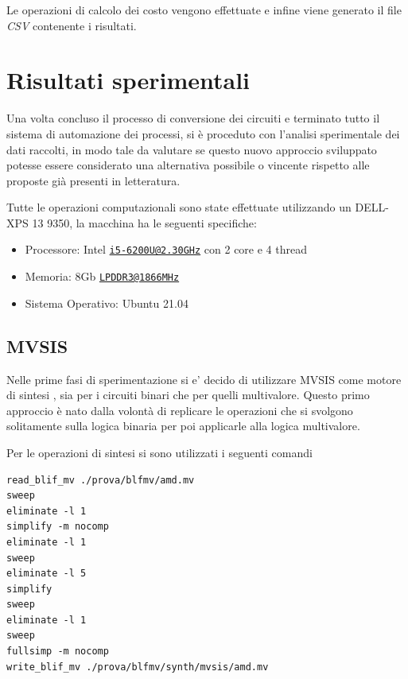 \documentclass[
  italian,
]{book}
\providecommand{\tightlist}{%
  \setlength{\itemsep}{0pt}\setlength{\parskip}{0pt}}
\begin{document}
Le operazioni di calcolo dei costo vengono effettuate e infine viene generato il file \emph{CSV} contenente i risultati.

\hypertarget{risultati-sperimentali}{%
\chapter{Risultati sperimentali}\label{risultati-sperimentali}}

Una volta concluso il processo di conversione dei circuiti e terminato tutto il sistema di automazione dei processi, si è proceduto con l'analisi sperimentale dei dati raccolti, in modo tale da valutare se questo nuovo approccio sviluppato potesse essere considerato una alternativa possibile o vincente rispetto alle proposte già presenti in letteratura.

Tutte le operazioni computazionali sono state effettuate utilizzando un DELL-XPS 13 9350, la macchina ha le seguenti specifiche:

\begin{itemize}
\tightlist
\item
  Processore: Intel \href{mailto:i5-6200U@2.30GHz}{\nolinkurl{i5-6200U@2.30GHz}} con 2 core e 4 thread
\item
  Memoria: 8Gb \href{mailto:LPDDR3@1866MHz}{\nolinkurl{LPDDR3@1866MHz}}
\item
  Sistema Operativo: Ubuntu 21.04
\end{itemize}

\newpage

\hypertarget{mvsis-2}{%
\section{MVSIS}\label{mvsis-2}}

Nelle prime fasi di sperimentazione si e' decido di utilizzare MVSIS come motore di sintesi , sia per i circuiti binari che per quelli multivalore. Questo primo approccio è nato dalla volontà di replicare le operazioni che si svolgono solitamente sulla logica binaria per poi applicarle alla logica multivalore.

Per le operazioni di sintesi si sono utilizzati i seguenti comandi

\begin{verbatim}
read_blif_mv ./prova/blfmv/amd.mv
sweep
eliminate -l 1
simplify -m nocomp
eliminate -l 1
sweep
eliminate -l 5
simplify
sweep
eliminate -l 1
sweep
fullsimp -m nocomp
write_blif_mv ./prova/blfmv/synth/mvsis/amd.mv
\end{verbatim}
\end{document}
